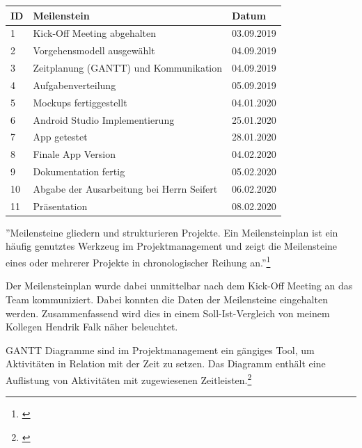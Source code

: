 \begin{tabularx}{\textwidth}{|p{2em}|X|p{5em}|}
\hline
\textbf{ID} & \textbf{Meilenstein} & \textbf{Datum} 
\\ \hline \hline
1 &Kick-Off Meeting abgehalten &	03.09.2019
\\ \hline
2&	Vorgehensmodell ausgewählt&	04.09.2019
\\ \hline
3&	Zeitplanung (GANTT) und Kommunikation&	04.09.2019
\\ \hline
4&	Aufgabenverteilung	&05.09.2019
\\ \hline
5&	Mockups fertiggestellt&	04.01.2020
\\ \hline
6&	Android Studio Implementierung&	25.01.2020
\\ \hline
7&	App getestet&	28.01.2020
\\ \hline
8&	Finale App Version&	04.02.2020
\\ \hline
9&	Dokumentation fertig&	05.02.2020
\\ \hline
10&	Abgabe der Ausarbeitung bei Herrn Seifert&	06.02.2020
\\ \hline
11&	Präsentation&	08.02.2020
\\ \hline
\end{tabularx}

''Meilensteine gliedern und strukturieren Projekte. Ein Meilensteinplan ist ein häufig genutztes Werkzeug im Projektmanagement und zeigt die Meilensteine eines oder mehrerer Projekte in chronologischer Reihung an.''\footnote{\cite[][]{t2informatik}}

Der Meilensteinplan wurde dabei unmittelbar nach dem Kick-Off Meeting an das Team kommuniziert. Dabei konnten die Daten der Meilensteine eingehalten werden. Zusammenfassend wird dies in einem Soll-Ist-Vergleich von meinem Kollegen Hendrik Falk näher beleuchtet.

GANTT Diagramme sind im Projektmanagement ein gängiges Tool, um Aktivitäten in Relation mit der Zeit zu setzen. Das Diagramm enthält eine Auflistung von Aktivitäten mit zugewiesenen Zeitleisten.\footnote{\cite[vgl.][]{ganttGentgesxy2001a}}

\clearpage


\enlargethispage{3\baselineskip}

